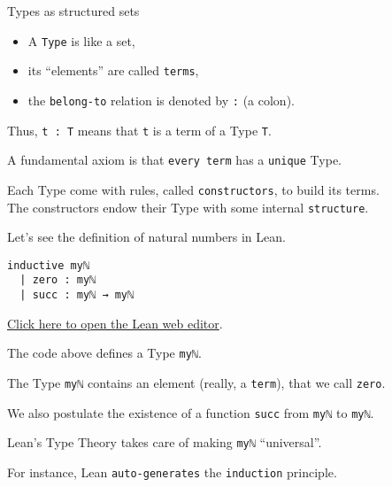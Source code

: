 \documentclass{beamer}
\begin{document}
\begin{frame}[fragile]{Types as structured sets}

\vspace{10pt}
\vspace{-13pt}
\begin{itemize}
\setlength\itemsep{-12pt}
\item
  A {\color{violet}\verb`Type`} is like a set,
\item
  its ``elements'' are called {\color{violet}\verb`terms`},
\item
  the {\color{violet}\verb`belong-to`} relation is denoted by {\color{violet}\verb`:`} (a colon).
\end{itemize}

Thus, {\color{violet}\verb`t : T`} means that {\color{violet}\verb`t`} is a term of a Type {\color{violet}\verb`T`}.

A fundamental axiom is that {\color{violet}\verb`every term`} has a {\color{violet}\verb`unique`} Type.

Each Type come with rules, called {\color{violet}\verb`constructors`}, to build its terms.
\\
The constructors endow their Type with some internal {\color{violet}\verb`structure`}.

Let's see the definition of natural numbers in Lean.
\end{frame}

\begin{frame}[fragile]

\begin{verbatim}
inductive myℕ
  | zero : myℕ
  | succ : myℕ → myℕ
\end{verbatim}
\vspace{-17pt}
{\small{\href{https://leanprover-community.github.io/lean-web-editor/#code=inductive%20my%E2%84%95%0A%20%20%7C%20zero%20%3A%20my%E2%84%95%0A%20%20%7C%20succ%20%3A%20my%E2%84%95%20%E2%86%92%20my%E2%84%95%0A%0A%23print%20prefix%20my%E2%84%95%0A}{Click here to open the Lean web editor}.}}

The code above defines a Type {\color{violet}\verb`myℕ`}.

The Type {\color{violet}\verb`myℕ`} contains an element (really, a {\color{violet}\verb`term`}), that we call {\color{violet}\verb`zero`}.

We also postulate the existence of a function {\color{violet}\verb`succ`} from {\color{violet}\verb`myℕ`} to {\color{violet}\verb`myℕ`}.

Lean's Type Theory takes care of making {\color{violet}\verb`myℕ`} ``universal''.

For instance, Lean {\color{violet}\verb`auto-generates`} the {\color{violet}\verb`induction`} principle.
\end{frame}
\end{document}
